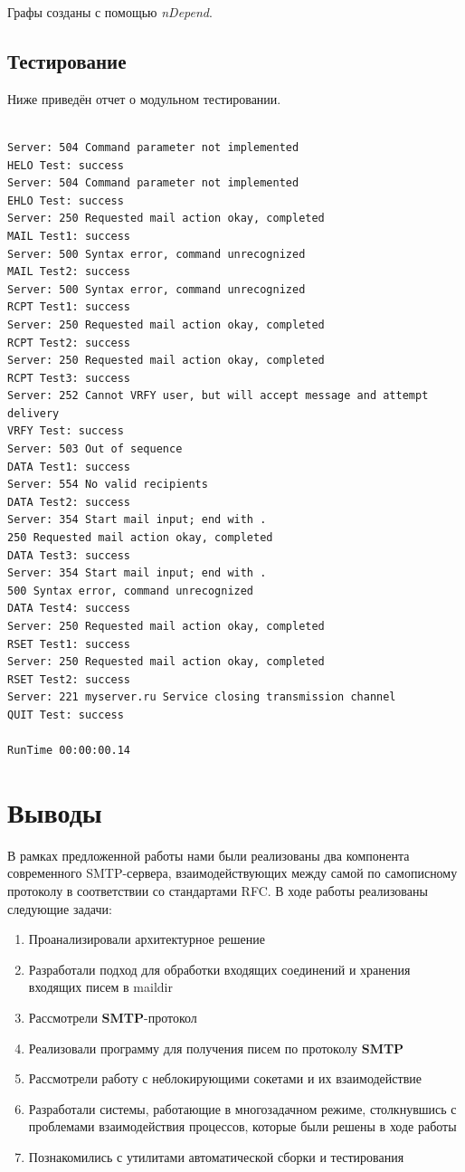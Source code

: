 \documentclass[a4paper,12pt]{report}
\begin{document}
Графы созданы с помощью \textit{nDepend}.

\vspace{100mm}

\section{Тестирование}

Ниже приведён отчет о модульном тестировании.

\begin{verbatim}

Server: 504 Command parameter not implemented
HELO Test: success
Server: 504 Command parameter not implemented
EHLO Test: success
Server: 250 Requested mail action okay, completed
MAIL Test1: success
Server: 500 Syntax error, command unrecognized
MAIL Test2: success
Server: 500 Syntax error, command unrecognized
RCPT Test1: success
Server: 250 Requested mail action okay, completed
RCPT Test2: success
Server: 250 Requested mail action okay, completed
RCPT Test3: success
Server: 252 Cannot VRFY user, but will accept message and attempt delivery
VRFY Test: success
Server: 503 Out of sequence
DATA Test1: success
Server: 554 No valid recipients
DATA Test2: success
Server: 354 Start mail input; end with .
250 Requested mail action okay, completed
DATA Test3: success
Server: 354 Start mail input; end with .
500 Syntax error, command unrecognized
DATA Test4: success
Server: 250 Requested mail action okay, completed
RSET Test1: success
Server: 250 Requested mail action okay, completed
RSET Test2: success
Server: 221 myserver.ru Service closing transmission channel
QUIT Test: success

RunTime 00:00:00.14

\end{verbatim}
\chapter*{Выводы}

В рамках предложенной работы нами были реализованы два компонента современного SMTP-сервера, взаимодействующих между самой по самописному протоколу в соответствии со стандартами RFC. В ходе работы реализованы следующие задачи: \\
\begin{enumerate}
	\item Проанализировали архитектурное решение
    \item Разработали подход для обработки входящих соединений и хранения входящих писем в maildir
    \item Рассмотрели \textbf{SMTP}-протокол
    \item Реализовали программу для получения писем по протоколу \textbf{SMTP}
    \item Рассмотрели работу с неблокирующими сокетами и их взаимодействие 
    \item Разработали системы, работающие в многозадачном режиме, столкнувшись с проблемами взаимодействия процессов, которые были решены в ходе работы
    \item Познакомились с утилитами автоматической сборки и тестирования
\end{enumerate}
\end{document}

